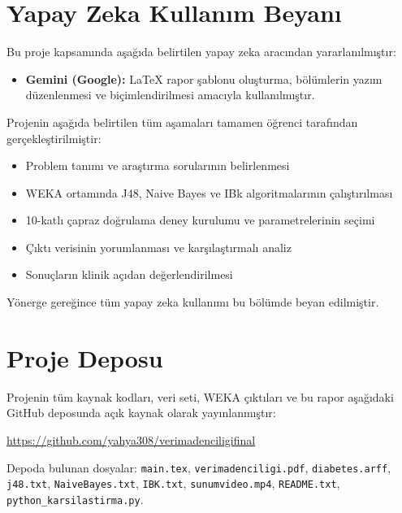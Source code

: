 \documentclass[12pt,a4paper]{article}
\begin{document}
\newpage
\section*{Yapay Zeka Kullanım Beyanı}

Bu proje kapsamında aşağıda belirtilen yapay zeka aracından yararlanılmıştır:

\begin{itemize}
  \item \textbf{Gemini (Google):} LaTeX rapor şablonu oluşturma,
        bölümlerin yazım düzenlenmesi ve biçimlendirilmesi amacıyla kullanılmıştır.
\end{itemize}

Projenin aşağıda belirtilen tüm aşamaları tamamen öğrenci tarafından
gerçekleştirilmiştir:

\begin{itemize}
  \item Problem tanımı ve araştırma sorularının belirlenmesi
  \item WEKA ortamında J48, Naive Bayes ve IBk algoritmalarının çalıştırılması
  \item 10-katlı çapraz doğrulama deney kurulumu ve parametrelerinin seçimi
  \item Çıktı verisinin yorumlanması ve karşılaştırmalı analiz
  \item Sonuçların klinik açıdan değerlendirilmesi
\end{itemize}

Yönerge gereğince tüm yapay zeka kullanımı bu bölümde beyan edilmiştir.

\section*{Proje Deposu}

Projenin tüm kaynak kodları, veri seti, WEKA çıktıları ve bu rapor aşağıdaki
GitHub deposunda açık kaynak olarak yayınlanmıştır:

\begin{center}
  \url{https://github.com/yahya308/verimadenciligifinal}
\end{center}

Depoda bulunan dosyalar: \texttt{main.tex}, \texttt{verimadenciligi.pdf},
\texttt{diabetes.arff}, \texttt{j48.txt}, \texttt{NaiveBayes.txt},
\texttt{IBK.txt}, \texttt{sunumvideo.mp4}, \texttt{README.txt}, \texttt{python\_karsilastirma.py}.
\end{document}
